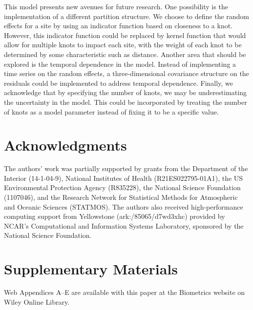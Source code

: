 \documentclass[useAMS,usenatbib,referee]{biom}
\begin{document}
This model presents new avenues for future research.
One possibility is the implementation of a different partition structure.
We choose to define the random effects for a site by using an indicator function based on closeness to a knot.
However, this indicator function could be replaced by kernel function that would allow for multiple knots to impact each site, with the weight of each knot to be determined by some characteristic such as distance.
Another area that should be explored is the temporal dependence in the model.
Instead of implementing a time series on the random effects, a three-dimensional covariance structure on the residuals could be implemented to address temporal dependence.
Finally, we acknowledge that by specifying the number of knots, we may be underestimating the uncertainty in the model.
This could be incorporated by treating the number of knots as a model parameter instead of fixing it to be a specific value.

\backmatter

\section*{Acknowledgments}
The authors' work was partially supported by grants from the Department of the Interior (14-1-04-9), National Institutes of Health (R21ES022795-01A1), the US Environmental Protection Agency (R835228), the National Science Foundation (1107046), and the Research Network for Statistical Methods for Atmospheric and Oceanic Sciences (STATMOS).
The authors also received high-performance computing support from Yellowstone (ark:/85065/d7wd3xhc) provided by NCAR's Computational and Information Systems Laboratory, sponsored by the National Science Foundation.

\section*{Supplementary Materials}
Web Appendices A--E are available with this paper at the Biometrics website on Wiley Online Library. \vspace*{-8pt}





\label{stlastpage}
\end{document}
